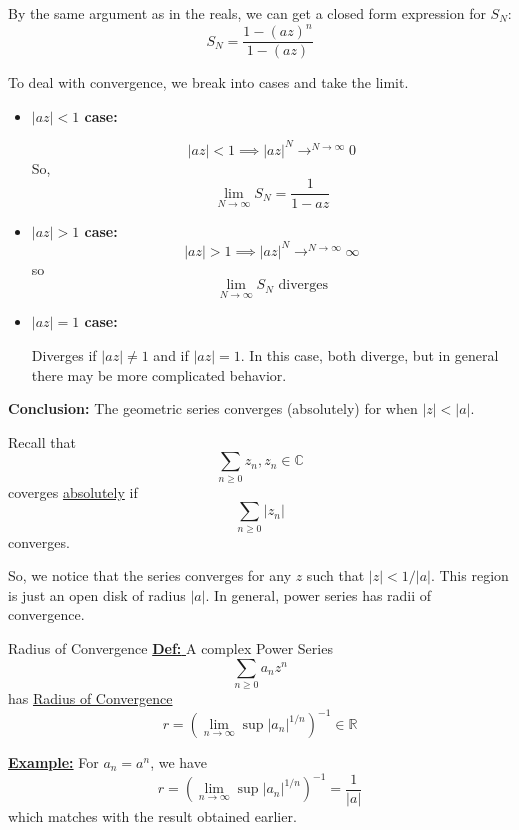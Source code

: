 \documentclass{article}
\newcommand{\C}{\mathbb{C}}
\begin{document}
\vskip 0.5cm
By the same argument as in the reals, we can get a closed form expression for $S_N$:
\[ S_N = \frac{1 - (az)^n}{1-(az)} \]

To deal with convergence, we break into cases and take the limit.
\begin{itemize}
  \item \textbf{$|az| < 1$ case:}
  
  \[ |az| < 1 \implies |az|^{N} \rightarrow^{N \rightarrow \infty} 0 \]
  So, 
  \[ \lim_{N \rightarrow \infty} S_N = \frac{1}{1 - az} \]

  \vskip 0.5cm
  \item \textbf{$|az| > 1$ case:}
  \[ |az| > 1 \implies |az|^{N} \rightarrow^{N \rightarrow \infty} \infty \]
  so 
  \[ \lim_{N \rightarrow \infty} S_N \text{ diverges} \]
  
  \vskip 0.5cm
  \item \textbf{$|az| = 1$ case:}
  
  Diverges if $|az| \neq 1$ and if $|az| = 1$. In this case, both diverge, but in general there may be more complicated behavior.
\end{itemize}

\textbf{Conclusion:} The geometric series converges (absolutely) for when $|z| < |a|$.

\vskip 0.5cm
\begin{dottedbox}
  Recall that 
  \[ \sum_{n \geq 0} z_n, z_n \in \C \] coverges \underline{absolutely} if 
  \[ \sum_{n \geq 0} |z_n| \] converges. 
\end{dottedbox}

\vskip 0.5cm
So, we notice that the series converges for any $z$ such that $|z| < 1/|a|$. This region is just an open disk of radius $|a|$. In general, power series has radii of convergence.

\begin{mathdefinitionbox}{Radius of Convergence}
  \vskip 0.5cm
  \underline{\textbf{Def: }} A complex Power Series
  \[ \sum_{n \geq 0} a_n z^n \]
  has \underline{Radius of Convergence}
  \[ r = \left( \lim_{n \rightarrow \infty} \sup |a_n|^{1/n} \right)^{-1} \in \mathbb{R} \]
\end{mathdefinitionbox}

\vskip 0.5cm
\underline{\textbf{Example:}} For $a_n = a^n$, we have
\[ r = \left( \lim_{n \rightarrow \infty} \sup |a_n|^{1/n} \right)^{-1} = \frac{1}{|a|}  \] which matches with the result obtained earlier.
\end{document}
